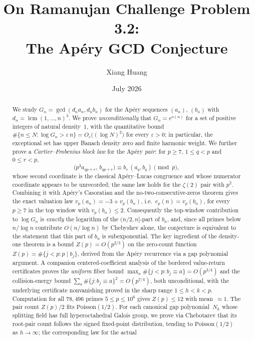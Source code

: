 \documentclass[11pt]{article}
\title{On Ramanujan Challenge Problem 3.2:\\
The Ap\'ery GCD Conjecture}
\author{Xiang Huang}
\date{July 2026}
\theoremstyle{definition}
\theoremstyle{remark}
\begin{document}
\maketitle

\begin{abstract}
We study $G_n = \gcd(d_n a_n, d_n b_n)$ for the Ap\'ery
sequences $(a_n)$, $(b_n)$ with $d_n = \operatorname{lcm}(1,\ldots,n)^3$.
We prove \emph{unconditionally} that $G_n = e^{o(n)}$
for a set of positive integers of natural density~$1$,
with the quantitative bound
$\#\{n \le N : \log G_n > \varepsilon\,n\}
= O_\varepsilon\bigl((\log N)^2\bigr)$
for every $\varepsilon > 0$; in particular, the
exceptional set has upper Banach density zero
and finite harmonic weight.
We further prove a \emph{Cartier--Frobenius block law} for the
Ap\'ery \emph{pair}: for $p\ge7$, $1\le q<p$ and $0\le r<p$,
\[
\bigl(p^3a_{qp+r},\,b_{qp+r}\bigr)\equiv b_r\,(a_q,b_q)\pmod p,
\]
whose second coordinate is the classical Ap\'ery--Lucas congruence and
whose numerator coordinate appears to be unrecorded; the same law
holds for the $\zeta(2)$ pair with $p^2$.  Combining it with Ap\'ery's
Casoratian and the no-two-consecutive-zeros theorem gives the exact
valuation law $v_p(a_n)=-3+v_p(b_n)$, i.e.\ $e_p(n)=v_p(b_n)$, for
every $p\ge7$ in the top window with $v_p(b_n)\le2$.  Consequently the
top-window contribution to $\log G_n$ is \emph{exactly} the logarithm
of the $(n/2,n]$-part of $b_n$, and, since all primes below
$n/\log n$ contribute $O(n/\log n)$ by Chebyshev alone, the conjecture
is equivalent to the statement that this part of $b_n$ is subexponential.
The key ingredient of the density-one theorem is a bound $Z(p) = O(p^{2/3})$ on the
zero-count function $Z(p) = \#\{j < p : p \mid b_j\}$,
derived from the Ap\'ery recurrence via a gap polynomial argument.
A companion centered-coefficient analysis of the bordered
value-return certificates proves the \emph{uniform} fiber bound
$\max_{a}\#\{j < p : b_j \equiv a\} = O(p^{3/4})$
and the collision-energy bound
$\sum_a \#\{j : b_j \equiv a\}^2 = O(p^{7/4})$,
both unconditional, with the underlying certificate
nonvanishing proved in the sharp range $1 \le h < k < p$.
Computation for all $78{,}496$ primes $5 \le p \le 10^6$ gives
$Z(p) \le 12$ with mean~$\approx 1$.
The pair count $Z(p)/2$ fits
$\mathrm{Poisson}(1/2)$.
For each canonical gap polynomial~$N_h$
whose splitting field has full hyperoctahedral
Galois group, we prove via Chebotarev that
its root-pair count follows the signed
fixed-point distribution, tending to
$\mathrm{Poisson}(1/2)$ as $h \to \infty$;
the corresponding law for the actual

\end{abstract}
\end{document}
